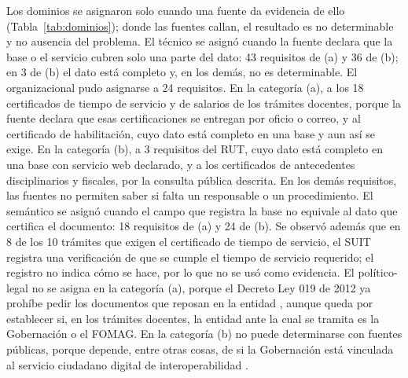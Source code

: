 Los dominios se asignaron solo cuando una fuente da evidencia de ello (Tabla~\ref{tab:dominios}); donde las fuentes callan, el resultado es no determinable y no ausencia del problema. El técnico se asignó cuando la fuente declara que la base o el servicio cubren solo una parte del dato: 43 requisitos de (a) y 36 de (b); en 3 de (b) el dato está completo y, en los demás, no es determinable. El organizacional pudo asignarse a 24 requisitos. En la categoría (a), a los 18 certificados de tiempo de servicio y de salarios de los trámites docentes, porque la fuente declara que esas certificaciones se entregan por oficio o correo, y al certificado de habilitación, cuyo dato está completo en una base y aun así se exige. En la categoría (b), a 3 requisitos del RUT, cuyo dato está completo en una base con servicio web declarado, y a los certificados de antecedentes disciplinarios y fiscales, por la consulta pública descrita. En los demás requisitos, las fuentes no permiten saber si falta un responsable o un procedimiento. El semántico se asignó cuando el campo que registra la base no equivale al dato que certifica el documento: 18 requisitos de (a) y 24 de (b). Se observó además que en 8 de los 10 trámites que exigen el certificado de tiempo de servicio, el SUIT registra una verificación de que se cumple el tiempo de servicio requerido; el registro no indica cómo se hace, por lo que no se usó como evidencia. El político-legal no se asigna en la categoría (a), porque el Decreto Ley 019 de 2012 ya prohíbe pedir los documentos que reposan en la entidad \parencite[art.~9]{colombia2012decreto019}, aunque queda por establecer si, en los trámites docentes, la entidad ante la cual se tramita es la Gobernación o el FOMAG. En la categoría (b) no puede determinarse con fuentes públicas, porque depende, entre otras cosas, de si la Gobernación está vinculada al servicio ciudadano digital de interoperabilidad .

